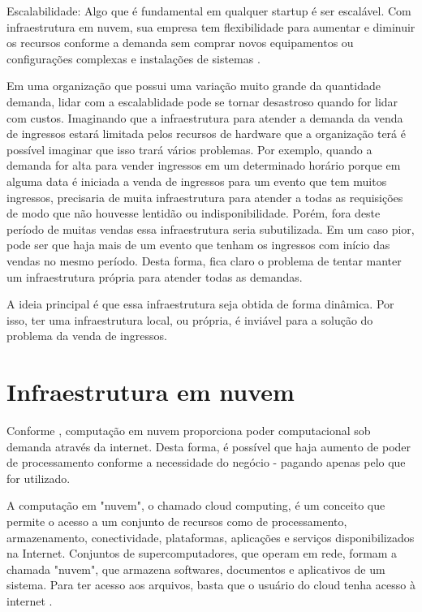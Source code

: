 \begin{citacao}
Escalabilidade: Algo que é fundamental em qualquer startup é ser escalável.
Com infraestrutura em nuvem, sua empresa tem flexibilidade para aumentar e
diminuir os recursos conforme a demanda sem comprar novos equipamentos ou
configurações complexas e instalações de
sistemas \cite{beneficios-da-computacao-em-nuvem-para-sua-startup}.

\end{citacao}

Em uma organização que possui uma variação muito grande da quantidade demanda, lidar
com a escalablidade pode se tornar desastroso quando for lidar com custos. Imaginando
que a infraestrutura para atender a demanda da venda de ingressos estará limitada
pelos recursos de hardware que a organização terá é possível imaginar que isso trará
vários problemas. Por exemplo, quando a demanda for alta para vender ingressos em um
determinado horário porque em alguma data é iniciada a venda de ingressos para um evento
que tem muitos ingressos, precisaria de muita infraestrutura para atender a todas as
requisições de modo que não houvesse lentidão ou indisponibilidade. Porém, fora deste
período de muitas vendas essa infraestrutura seria subutilizada. Em um caso pior, pode
ser que haja mais de um evento que tenham os ingressos com início das vendas no mesmo
período. Desta forma, fica claro o problema de tentar manter um infraestrutura própria
para atender todas as demandas.

A ideia principal é que essa infraestrutura seja obtida de forma dinâmica. Por isso,
ter uma infraestrutura local, ou própria, é inviável para a solução do problema da
venda de ingressos.

\section{Infraestrutura em nuvem}\label{infraestrutura-em-nuvem}

Conforme \cite{what-is-cloud-computing}, computação em nuvem proporciona poder computacional
sob demanda através da internet. Desta forma, é possível que haja aumento de poder
de processamento conforme a necessidade do negócio - pagando apenas pelo que for utilizado.

\begin{citacao}
A computação em "nuvem", o chamado cloud computing, é um conceito que permite o acesso a
um conjunto de recursos como de processamento, armazenamento, conectividade, plataformas,
aplicações e serviços disponibilizados na Internet. Conjuntos de supercomputadores, que operam em
rede, formam a chamada "nuvem", que armazena softwares, documentos e aplicativos de um sistema.
Para ter acesso aos arquivos, basta que o usuário do cloud tenha acesso à internet
\cite{cloud-computing-conceitos-e-perspectivas-2012}.
\end{citacao}

